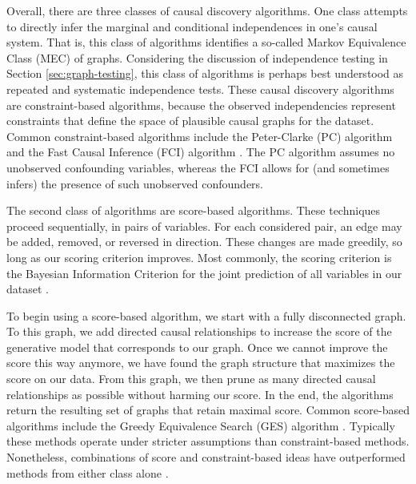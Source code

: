 Overall, there are three classes of causal discovery algorithms.
One class attempts to directly infer the marginal and conditional independences in one's causal system.
That is, this class of algorithms identifies a so-called Markov Equivalence Class (MEC) of graphs.
Considering the discussion of independence testing in Section \ref{sec:graph-testing}, this class of algorithms is perhaps best understood as repeated and systematic independence tests.
These causal discovery algorithms are constraint-based algorithms, because the observed independencies represent constraints that define the space of plausible causal graphs for the dataset.
Common constraint-based algorithms include the Peter-Clarke (PC) algorithm and the Fast Causal Inference (FCI) algorithm \citep{glymour_2001_causation}.
The PC algorithm assumes no unobserved confounding variables, whereas the FCI allows for (and sometimes infers) the presence of such unobserved confounders.

The second class of algorithms are score-based algorithms.
These techniques proceed sequentially, in pairs of variables.
For each considered pair, an edge may be added, removed, or reversed in direction.
These changes are made greedily, so long as our scoring criterion improves.
Most commonly, the scoring criterion is the Bayesian Information Criterion for the joint prediction of all variables in our dataset \citep{malinsky_2018_causal}.

To begin using a score-based algorithm, we start with a fully disconnected graph.
To this graph, we add directed causal relationships to increase the score of the generative model that corresponds to our graph.
Once we cannot improve the score this way anymore, we have found the graph structure that maximizes the score on our data.
From this graph, we then prune as many directed causal relationships as possible without harming our score.
In the end, the algorithms return the resulting set of graphs that retain maximal score.
Common score-based algorithms include the Greedy Equivalence Search (GES) algorithm \citep{chickering_2002_optimal}.
Typically these methods operate under stricter assumptions than constraint-based methods.
Nonetheless, combinations of score and constraint-based ideas have outperformed methods from either class alone \citep{glymour_2019_review}.

